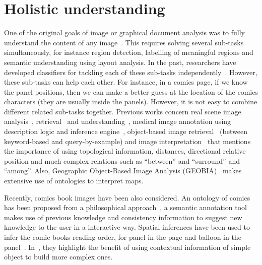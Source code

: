 \section{Holistic understanding} %
\label{sec:sota:holistic_understanding}

One of the original goals of image or graphical document analysis was to fully understand the content of any image~\cite{Lamiroy2014Handbook}.
This requires solving several sub-tasks simultaneously, for instance region detection, labelling of meaningful regions and semantic understanding using layout analysis.
In the past, researchers have developed classifiers for tackling each of these sub-tasks independently~\cite{Mao2003Document}.
However, these sub-tasks can help each other.
For instance, in a comics page, if we know the panel positions, then we can make a better guess at the location of the comics characters (they are usually inside the panels).
However, it is not easy to combine different related sub-tasks together.
Previous works concern real scene image analysis~\cite{Blaschke2014Geographic}, retrieval~\cite{Sciascio2011Structured} and understanding~\cite{Li2012Toward,Fidler2012Describing}, medical image annotation using description logic and inference engine~\cite{Hu2003Ontology}, object-based image retrieval~\cite{Mezaris03anontology,Sarwar2013Ontology} (between keyword-based and query-by-example) and image interpretation~\cite{Hudelot2008Fuzzy,Ogier2000Semantic} that mentions the importance of using topological information, distances, directional relative position and much complex relations such as ``between'' and ``surround'' and ``among''.
Also, Geographic Object-Based Image Analysis (GEOBIA)~\cite{Blaschke2014Geographic} makes extensive use of ontologies to interpret maps.


Recently, comics book images have been also considered.
An ontology of comics has been proposed from a philosophical approach~\cite{Aaron2011}, a semantic annotation tool~\cite{Hermann2012Guided} makes use of previous knowledge and consistency information to suggest new knowledge to the user in a interactive way.
Spatial inferences have been used to infer the comic books reading order, for panel in the page and balloon in the panel~\cite{Guerin2012Ontologies}. 
In~\cite{Sciascio2011Structured}, they highlight the benefit of using contextual information of simple object to build more complex ones.

